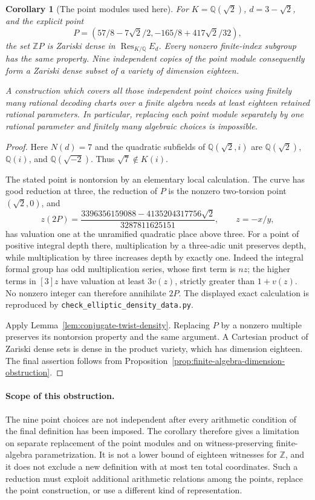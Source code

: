 \documentclass[11pt]{article}
\newtheorem{corollary}[theorem]{Corollary}
\theoremstyle{definition}
\begin{document}
\begin{corollary}[The point modules used here]
\label{cor:point-modules-dimension}
For $K=\mathbb Q(\sqrt2)$, $d=3-\sqrt2$, and the explicit
point
\[
 P=(57/8-7\sqrt2/2,-165/8+417\sqrt2/32),
\]
the set $\mathbb ZP$ is Zariski dense in
$\operatorname{Res}_{K/\mathbb Q}E_d$.  Every nonzero
finite-index subgroup has the same property.  Nine independent
copies of the point module consequently form a Zariski dense
subset of a variety of dimension eighteen.

A construction which covers all those independent point choices
using finitely many rational decoding charts over a finite
algebra needs at least eighteen retained rational parameters.
In particular, replacing each point module separately by one
rational parameter and finitely many algebraic choices is
impossible.
\end{corollary}
\begin{proof}
Here $N(d)=7$ and the quadratic subfields of
$\mathbb Q(\sqrt2,i)$ are
$\mathbb Q(\sqrt2)$, $\mathbb Q(i)$, and
$\mathbb Q(\sqrt{-2})$.  Thus $\sqrt7\notin K(i)$.

The stated point is nontorsion by an elementary local calculation.
The curve has good reduction at three, the reduction of $P$ is
the nonzero two-torsion point $(\sqrt2,0)$, and
\[
 z(2P)=
 \frac{3396356159088-4135204317756\sqrt2}{3287811625151},
 \qquad z=-x/y,
\]
has valuation one at the unramified quadratic place above three.
For a point of positive integral depth there, multiplication by
a three-adic unit preserves depth, while multiplication by three
increases depth by exactly one.  Indeed the integral formal
group has odd multiplication series, whose first term is $nz$;
the higher terms in $[3]z$ have valuation at least $3v(z)$,
strictly greater than $1+v(z)$.  No nonzero integer can therefore
annihilate $2P$.  The displayed exact calculation is reproduced
by \texttt{check\_elliptic\_density\_data.py}.

Apply Lemma~\ref{lem:conjugate-twist-density}.  Replacing $P$
by a nonzero multiple preserves its nontorsion property and
the same argument.  A Cartesian product of Zariski dense sets
is dense in the product variety, which has dimension eighteen.
The final assertion follows from
Proposition~\ref{prop:finite-algebra-dimension-obstruction}.
\end{proof}

\paragraph{Scope of this obstruction.}
The nine point choices are not independent after every arithmetic
condition of the final definition has been imposed.  The corollary
therefore gives a limitation on separate replacement of the point
modules and on witness-preserving finite-algebra parametrization.
It is not a lower bound of eighteen witnesses for $\mathbb Z$,
and it does not exclude a new definition with at most ten total
coordinates.  Such a reduction must exploit additional arithmetic
relations among the points, replace the point construction, or use
a different kind of representation.
\end{document}

